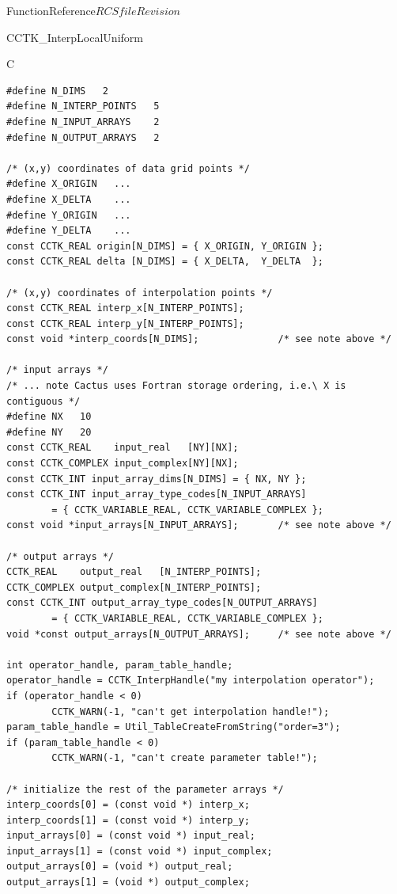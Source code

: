 \begin{cactuspart}{FunctionReference}{$RCSfile$}{$Revision$}
\begin{FunctionDescription}{CCTK\_InterpLocalUniform}
\begin{ExampleSection}
\begin{Example}{C}
\begin{verbatim}
#define N_DIMS   2
#define N_INTERP_POINTS   5
#define N_INPUT_ARRAYS    2
#define N_OUTPUT_ARRAYS   2

/* (x,y) coordinates of data grid points */
#define X_ORIGIN   ...
#define X_DELTA    ...
#define Y_ORIGIN   ...
#define Y_DELTA    ...
const CCTK_REAL origin[N_DIMS] = { X_ORIGIN, Y_ORIGIN };
const CCTK_REAL delta [N_DIMS] = { X_DELTA,  Y_DELTA  };

/* (x,y) coordinates of interpolation points */
const CCTK_REAL interp_x[N_INTERP_POINTS];
const CCTK_REAL interp_y[N_INTERP_POINTS];
const void *interp_coords[N_DIMS];              /* see note above */

/* input arrays */
/* ... note Cactus uses Fortran storage ordering, i.e.\ X is contiguous */
#define NX   10
#define NY   20
const CCTK_REAL    input_real   [NY][NX];
const CCTK_COMPLEX input_complex[NY][NX];
const CCTK_INT input_array_dims[N_DIMS] = { NX, NY };
const CCTK_INT input_array_type_codes[N_INPUT_ARRAYS]
        = { CCTK_VARIABLE_REAL, CCTK_VARIABLE_COMPLEX };
const void *input_arrays[N_INPUT_ARRAYS];       /* see note above */

/* output arrays */
CCTK_REAL    output_real   [N_INTERP_POINTS];
CCTK_COMPLEX output_complex[N_INTERP_POINTS];
const CCTK_INT output_array_type_codes[N_OUTPUT_ARRAYS]
        = { CCTK_VARIABLE_REAL, CCTK_VARIABLE_COMPLEX };
void *const output_arrays[N_OUTPUT_ARRAYS];     /* see note above */

int operator_handle, param_table_handle;
operator_handle = CCTK_InterpHandle("my interpolation operator");
if (operator_handle < 0)
        CCTK_WARN(-1, "can't get interpolation handle!");
param_table_handle = Util_TableCreateFromString("order=3");
if (param_table_handle < 0)
        CCTK_WARN(-1, "can't create parameter table!");

/* initialize the rest of the parameter arrays */
interp_coords[0] = (const void *) interp_x;
interp_coords[1] = (const void *) interp_y;
input_arrays[0] = (const void *) input_real;
input_arrays[1] = (const void *) input_complex;
output_arrays[0] = (void *) output_real;
output_arrays[1] = (void *) output_complex;


\end{verbatim}
\end{Example}
\end{ExampleSection}
\end{FunctionDescription}
\end{cactuspart}
